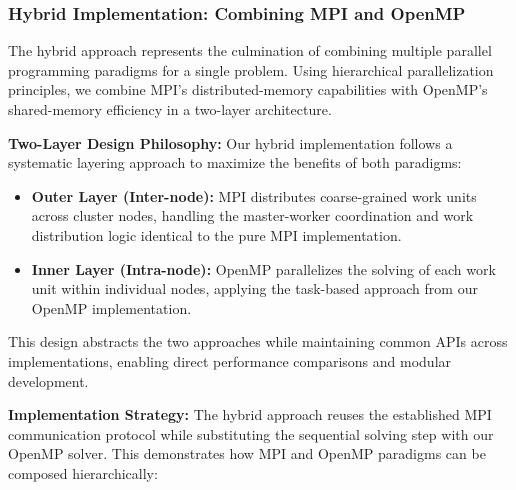 \subsubsection{Hybrid Implementation: Combining MPI and OpenMP}
\label{subsubsec:hybrid_implementation}

The hybrid approach represents the culmination of combining multiple parallel programming paradigms for a single problem. Using hierarchical parallelization principles, we combine MPI's distributed-memory capabilities with OpenMP's shared-memory efficiency in a two-layer architecture.

\textbf{Two-Layer Design Philosophy:}
Our hybrid implementation follows a systematic layering approach to maximize the benefits of both paradigms:

\begin{itemize}
    \item \textbf{Outer Layer (Inter-node):} MPI distributes coarse-grained work units across cluster nodes, handling the master-worker coordination and work distribution logic identical to the pure MPI implementation.
    \item \textbf{Inner Layer (Intra-node):} OpenMP parallelizes the solving of each work unit within individual nodes, applying the task-based approach from our OpenMP implementation.
\end{itemize}

This design abstracts the two approaches while maintaining common APIs across implementations, enabling direct performance comparisons and modular development.

\textbf{Implementation Strategy:}
The hybrid approach reuses the established MPI communication protocol while substituting the sequential solving step with our OpenMP solver. This demonstrates how MPI and OpenMP paradigms can be composed hierarchically:

